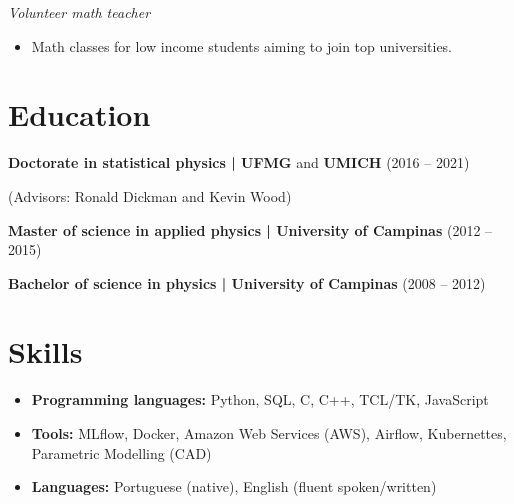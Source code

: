 \documentclass[10pt,a4paper]{article}
\begin{document}
\textit{Volunteer math teacher} 
\begin{itemize}[noitemsep, topsep=0pt]
	\item Math classes for low income students aiming to join top universities.
\end{itemize}

\section{Education}

\textbf{Doctorate in statistical physics | UFMG} and \textbf{UMICH} (2016 -- 2021)

(Advisors: Ronald Dickman and Kevin Wood)

\vspace{4pt}

\textbf{Master of science in applied physics | University of Campinas} (2012 -- 2015)

\vspace{2pt}

\textbf{Bachelor of science in physics | University of Campinas} (2008 -- 2012)

\section{Skills}
\begin{itemize}[label={}, leftmargin=0pt, noitemsep]
	\item \textbf{Programming languages:} Python, SQL, C, C++, TCL/TK, JavaScript
	\item \textbf{Tools:} MLflow, Docker, Amazon Web Services (AWS), Airflow, Kubernettes, Parametric Modelling (CAD)
    \item \textbf{Languages:} Portuguese (native), English (fluent spoken/written) 
\end{itemize}
\end{document}
